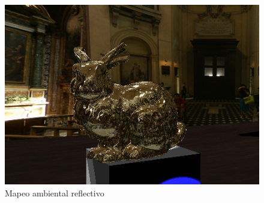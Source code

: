 \documentclass[12pt]{article}
\begin{document}
{\begin{figure}[H]
\centering
\includegraphics[scale=0.5]{images/reflec.png}
\caption{Mapeo ambiental reflectivo}
\end{figure}

}
\end{document}
